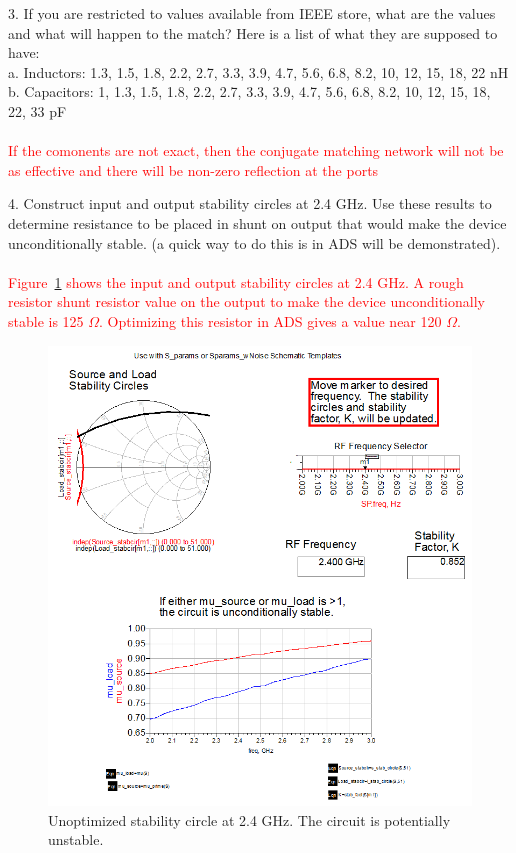 \documentclass[conference]{IEEEtran}
\begin{document}
3. If you are restricted to values available from IEEE store, what are the values and what will happen to the match? Here is a list of what they are supposed to have:\\
a. Inductors: 1.3, 1.5, 1.8, 2.2, 2.7, 3.3, 3.9, 4.7, 5.6, 6.8, 8.2, 10, 12, 15, 18, 22 nH\\
b. Capacitors: 1, 1.3, 1.5, 1.8, 2.2, 2.7, 3.3, 3.9, 4.7, 5.6, 6.8, 8.2, 10, 12, 15, 18, 22, 33 pF\\\\
\textcolor{red}{If the comonents are not exact, then the conjugate matching network will not be as effective and there will be non-zero reflection at the ports}

4. Construct input and output stability circles at 2.4 GHz. Use these results to determine resistance to be placed in shunt on output that would make the device unconditionally stable. (a quick way to do this is in ADS will be demonstrated).\\\\
\textcolor{red}{Figure~\ref{fig:stabcircle} shows the input and output stability circles at 2.4 GHz.  A rough resistor shunt resistor value on the output to make the device unconditionally stable is 125 $\Omega$.  Optimizing this resistor in ADS gives a value near 120 $\Omega$.}
\begin{figure}[!h]
\centering
\includegraphics[scale=0.45]{pic/stabcircle.png}
\caption{Unoptimized stability circle at 2.4 GHz.  The circuit is potentially unstable.}
\label{fig:stabcircle}
\end{figure}
\end{document}
